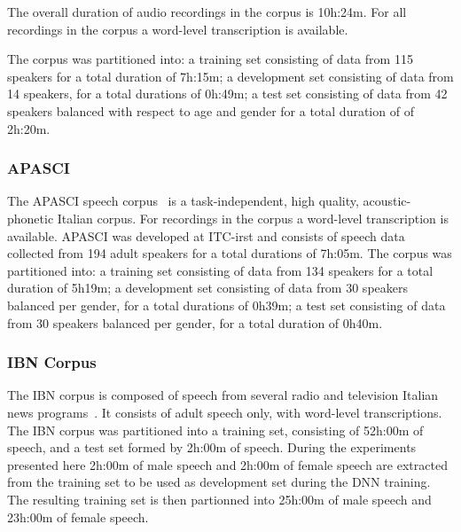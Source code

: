 \documentclass{nle}
\begin{document}
The overall  duration of audio recordings in  the corpus is
10h:24m. For  all  recordings  in  the  corpus  a
word-level   transcription   is  available.    

The corpus was partitioned into: a training set  consisting of data from 115 speakers
for a  total duration of 7h:15m;  a development set  consisting of data
from  14  speakers,  for a  total  durations  of  0h:49m; a  test  set
consisting of data  from 42 speakers balanced with  respect to age and
gender for a total duration of of 2h:20m.


\subsubsection{APASCI}
The    APASCI   speech    corpus~\citep*{AngBruFalGiuGreOmo94}    is   a
task-independent,    high     quality,    acoustic-phonetic    Italian
corpus. For recordings in the corpus a word-level transcription is available. APASCI was  developed at ITC-irst and consists  of speech data collected from  194 adult  speakers for a  total durations  of 7h:05m.
The corpus  was partitioned  into: a training  set consisting  of data
from 134  speakers for a total  duration of 5h19m;  a development set
consisting of data  from 30 speakers balanced per  gender, for a total
durations of  0h39m; a test set  consisting of data  from 30 speakers
balanced per gender, for a total duration of 0h40m.

\subsubsection{IBN Corpus}
The IBN corpus is composed of speech from several radio and television
Italian news programs~\citep{GerGiuBru09}. It consists of adult speech
only, with word-level transcriptions. The IBN corpus was  partitioned into a training set, consisting
of 52h:00m of speech, and a test set formed by 2h:00m of speech. During the experiments presented here 2h:00m of male speech and 2h:00m of female speech are extracted from the training set to be used as development set during the DNN training. The resulting training set is then partionned into 25h:00m of male speech and 23h:00m of female speech.

\end{document}
